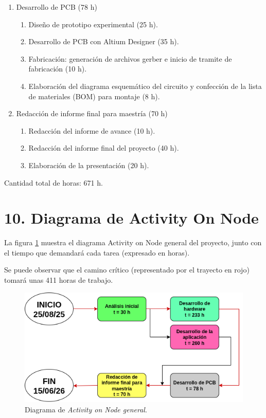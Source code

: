 \documentclass[
11pt, %
]{charter}
\begin{document}
\begin{enumerate}
\item Desarrollo de PCB (78 h)
	\begin{enumerate}
		\item Diseño de prototipo experimental (25 h).
		\item Desarrollo de PCB con Altium Designer (35 h).
		\item Fabricación: generación de archivos gerber e inicio de tramite de fabricación (10 h).
		\item Elaboración del diagrama esquemático del circuito y confección de la lista de materiales (BOM) para montaje (8 h).
	\end{enumerate}
\item Redacción de informe final para maestría (70 h)
	\begin{enumerate}
		\item Redacción del informe de avance (10 h).
		\item Redacción del informe final del proyecto (40 h).
		\item Elaboración de la presentación (20 h).
	\end{enumerate}
\end{enumerate}

Cantidad total de horas: 671 h.

\section{10. Diagrama de Activity On Node}
\label{sec:AoN}

La figura \ref{fig:aongeneral} muestra el diagrama Activity on Node general del proyecto, junto con el tiempo que demandará cada tarea (expresado en horas).

Se puede observar que el camino crítico (representado por el trayecto en rojo) tomará unas 411 horas de trabajo.

\begin{figure}[htpb]
\centering 
\includegraphics[width=.8\textwidth]{./Figuras/aon_general.png}
\caption{Diagrama de \textit{Activity on Node general}.}
\label{fig:aongeneral}
\end{figure}
\end{document}
